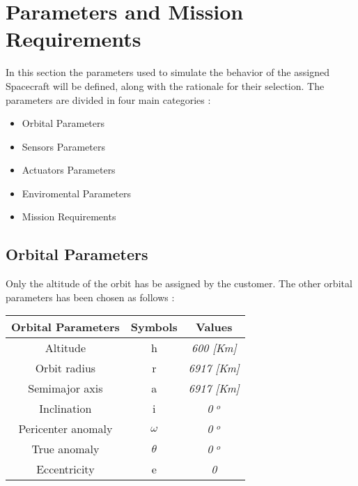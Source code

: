\documentclass[11pt,a4paper]{report}
\begin{document}





\tableofcontents{}

\clearpage{}


\setcounter{page}{3}

\chapter{Parameters and Mission Requirements}
In this section the parameters used to simulate the behavior of the assigned Spacecraft will be defined, along with the rationale for their selection. 
The parameters are divided in four main categories : 

\begin{itemize}
 \item Orbital Parameters
 \item Sensors Parameters
 \item Actuators Parameters
 \item Enviromental Parameters
 \item Mission Requirements
\end{itemize}

\section{Orbital Parameters}

Only the altitude of the orbit has be assigned by the customer. 
The other orbital parameters has been chosen as follows : 
\begin{center}
	\renewcommand{\arraystretch}{1.2}
	\begin{tabular}{|c|c|c|}
		\hline
		Orbital Parameters & Symbols & Values \\
		\hline
		Altitude & h & \textit{600 [Km]} \\
		\hline
		Orbit radius & r & \textit{6917 [Km]}\\
		\hline
		Semimajor axis & a & \textit{6917 [Km]}\\
		\hline
		Inclination & i & \textit{0 $^{o}$}\\
		\hline
		Pericenter anomaly & $\omega$ & \textit{0 $^{o}$}\\
		\hline
		True anomaly & $\theta$ &  \textit{0 $^{o}$}\\
		\hline
		Eccentricity & e &  \textit{0}\\
		\hline	
	\end{tabular}
\end{center}
\end{document}
